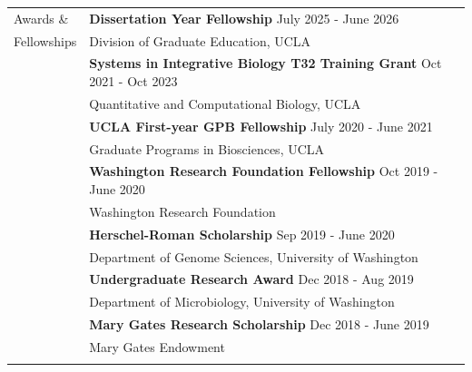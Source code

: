\documentclass[letterpaper,11pt,oneside]{article}
\begin{document}
\noindent \begin{tabular}{@{} l l}
			\Large{Awards \& }    & \textbf{Dissertation Year Fellowship} \hfill July 2025 - June 2026\\		
	\Large{Fellowships}    & Division of Graduate Education, UCLA \\
		& \textbf{Systems in Integrative Biology T32 Training Grant} \hfill Oct 2021 - Oct 2023\\
		& Quantitative and Computational Biology, UCLA \\		
		& \textbf{UCLA First-year GPB Fellowship} \hfill July 2020 - June 2021\\	
		& Graduate Programs in Biosciences, UCLA \\
		& \textbf{Washington Research Foundation Fellowship} \hfill Oct 2019 - June 2020\\
		& Washington Research Foundation \\
		& \textbf{Herschel-Roman Scholarship} \hfill Sep 2019 - June 2020\\
		& Department of Genome Sciences, University of Washington \\
 		& \textbf{Undergraduate Research Award} \hfill Dec 2018 - Aug 2019 \\
 		& Department of Microbiology, University of Washington \\
		& \textbf{Mary Gates Research Scholarship} \hfill Dec 2018 - June 2019\\
		& Mary Gates Endowment \\

	\tabularnewline		


\end{tabular}
\end{document}
